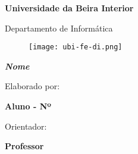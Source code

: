 \documentclass[12pt,a4paper]{memoir}
\begin{document}


\thispagestyle{empty}
\setcounter{page}{-1}

\begin{center}
\begin{Huge}
\textbf{Universidade da Beira Interior}
\end{Huge}
\end{center}

\begin{center}
\begin{Huge}
Departamento de Informática
\end{Huge}
\end{center}

\vspace{0,07cm}
\begin{figure}[!htb]
\centering
\texttt{[image: ubi-fe-di.png]}
\end{figure}

\vspace{0.5cm}
\begin{center}
\begin{Large}
\textbf{\emph{Nome}}
\end{Large}
\end{center}


\vspace{0.5cm}
\begin{center}
\begin{normalsize}
\begin{large}
Elaborado por:
\end{large}
\end{normalsize}
\end{center}

\begin{center}
\begin{large}
\textbf{Aluno - Nº} \\
\end{large}
\end{center}

\vspace{0,5cm}
\begin{center}
\begin{normalsize}
\begin{large}
Orientador:
\end{large}
\end{normalsize}
\end{center}

\begin{center}
\begin{large}
\textbf{Professor}
\end{large}
\end{center}
\end{document}
